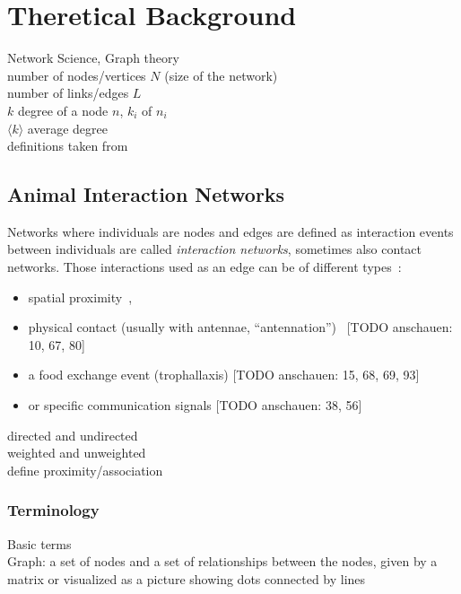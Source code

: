 \chapter{Theretical Background}
Network Science, Graph theory\\
number of nodes/vertices $N$ (size of the network)\\
number of links/edges $L$\\
$k$ degree of a node $n$, $k_i$ of $n_i$\\
$ \langle k  \rangle$ average degree\\
definitions taken from~\textcite{barabasi2016network}\\




\section{Animal Interaction Networks}

Networks where individuals are nodes and edges are defined as interaction events between individuals are called \emph{interaction networks}, sometimes also contact networks. 
Those interactions used as an edge can be of different types~\cite{charbonneau2013social}:

\begin{itemize}
\item spatial proximity~\cite{jeanson2012long, otterstatter2007contact},
\item physical contact (usually with antennae, “antennation”)~\cite{mersch2013tracking} [TODO anschauen: 10, 67, 80]
\item a food exchange event (trophallaxis) [TODO anschauen: 15, 68, 69, 93]
\item or specific communication signals [TODO anschauen: 38, 56]
\end{itemize}

directed and undirected\\
weighted and unweighted\\

define proximity/association\\

\subsection{Terminology}
Basic terms\\

Graph: a set of nodes and a set of relationships between the
nodes, given by a matrix or visualized as a picture showing
dots connected by lines\\

